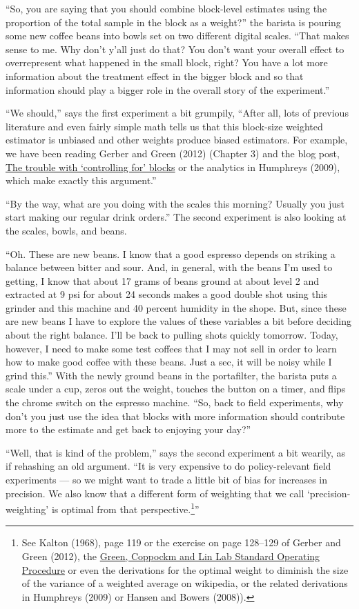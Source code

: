 \documentclass[
]{article}
\begin{document}
``So, you are saying that you should combine block-level estimates using the
proportion of the total sample in the block as a weight?'' the barista is
pouring some new coffee beans into bowls set on two different digital scales. ``That makes sense
to me. Why don't y'all just do that? You don't want your overall effect to
overrepresent what happened in the small block, right? You have a lot more
information about the treatment effect in the bigger block and so that
information should play a bigger role in the overall story of the experiment.''

``We should,'' says the first experiment a bit grumpily, ``After all, lots of
previous literature and even fairly simple math tells us that this block-size
weighted estimator is unbiased and other weights produce biased estimators. For
example, we have been reading Gerber and Green (2012) (Chapter 3) and the blog post,
\href{https://declaredesign.org/blog/biased-fixed-effects.html}{The trouble with `controlling for'
blocks} or the
analytics in Humphreys (2009), which make exactly this argument.''

``By the way, what are you doing with the scales this morning? Usually you just
start making our regular drink orders.'' The second experiment is also looking
at the scales, bowls, and beans.

``Oh. These are new beans. I know that a good espresso depends on striking a
balance between bitter and sour. And, in general, with the beans I'm used to
getting, I know that about 17 grams of beans ground at about level 2 and
extracted at 9 psi for about 24 seconds makes a good double shot using this
grinder and this machine and 40 percent humidity in the shope. But, since these
are new beans I have to explore the values of these variables a bit before
deciding about the right balance. I'll be back to pulling shots quickly
tomorrow. Today, however, I need to make some test coffees that I may not sell
in order to learn how to make good coffee with these beans. Just a sec, it will
be noisy while I grind this.'' With the newly ground beans in the portafilter,
the barista puts a scale under a cup, zeros out the weight, touches the button
on a timer, and flips the chrome switch on the espresso machine. ``So, back to
field experiments, why don't you just use the idea that blocks with more
information should contribute more to the estimate and get back to enjoying
your day?''

``Well, that is kind of the problem,'' says the second experiment a bit wearily, as if rehashing an old argument. ``It is very expensive to do policy-relevant field experiments --- so we might want to trade a little bit of bias for increases in precision. We also know that a different form of weighting that we call `precision-weighting' is optimal from that perspective.\footnote{See Kalton (1968), page 119 or the exercise on page 128--129 of Gerber and Green (2012), the \href{https://alexandercoppock.com/Green-Lab-SOP/Green_Lab_SOP.html\#taking-block-randomization-into-account-in-ses-and-cis}{Green, Coppockm and Lin Lab Standard Operating Procedure} or even the derivations for the optimal weight to diminish the size of the variance of a weighted average on wikipedia, or the related derivations in Humphreys (2009) or Hansen and Bowers (2008)).}''
\end{document}

